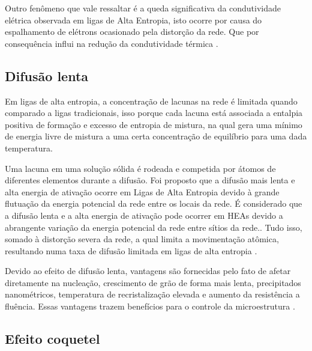 Outro fenômeno que vale ressaltar é a queda significativa da condutividade elétrica observada em ligas de Alta Entropia, isto ocorre por causa do espalhamento de elétrons ocasionado pela distorção da rede. Que por consequência influi na redução da condutividade térmica \cite{kao2011electrical}.



\pagebreak

\subsection{Difusão lenta}\label{sec:LABEL_CHP_3_SEC_B_SUB_D}

Em ligas de alta entropia, a concentração de lacunas na rede é limitada quando comparado a ligas tradicionais, isso porque cada lacuna está associada a entalpia positiva de formação e excesso de entropia de mistura, na qual gera uma mínimo de energia livre de mistura a uma certa concentração de equilíbrio para uma dada temperatura. \cite{thermodynamicsOfSolid}


Uma lacuna em uma solução sólida é rodeada e competida por átomos de diferentes elementos durante a difusão. Foi proposto que a difusão mais lenta e alta energia de ativação ocorre em Ligas de Alta Entropia devido à grande flutuação da energia potencial da rede entre os locais da rede. É considerado que a difusão lenta e a alta energia de ativação pode ocorrer em HEAs devido a abrangente variação da energia potencial da rede entre sítios da rede.\cite{tsai2013sluggish}. Tudo isso, somado à distorção severa da rede, a qual limita a movimentação atômica, resultando numa taxa de difusão limitada em ligas de alta entropia \cite{jien2006recent}.

Devido ao efeito de difusão lenta, vantagens são fornecidas pelo fato de afetar diretamente na nucleação, crescimento de grão de forma mais lenta, precipitados nanométricos, temperatura de recristalização elevada e aumento da resistência a fluência. Essas vantagens trazem benefícios para o controle da microestrutura \cite{gao2016high}.


\subsection{Efeito coquetel}\label{sec:LABEL_CHP_3_SEC_B_SUB_E}

